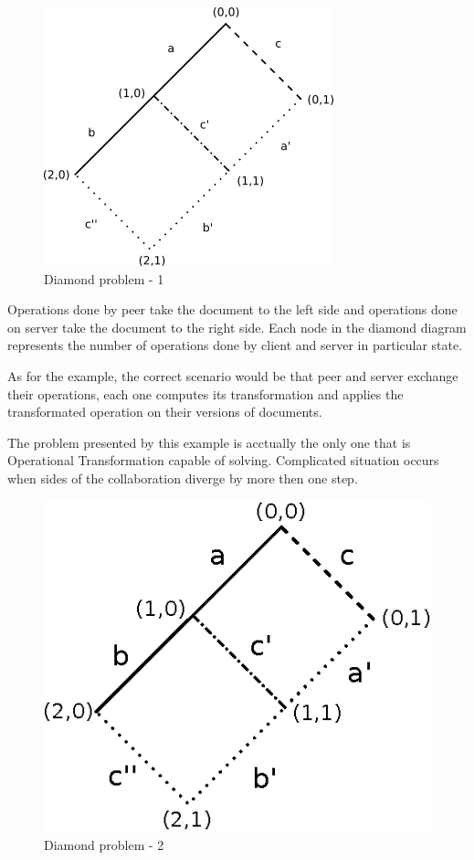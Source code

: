 \documentclass[12pt,oneside]{fithesis2}
\begin{document}
\begin{figure}[H]
\caption{Diamond problem - 1}
\label{fig:diamond1}
\centering
\vspace{5mm}
\includegraphics{diamond1}
\end{figure}
Operations done by peer take the document to the left side and operations done on server take the document to the right side. Each node in the diamond diagram represents the number of operations done by client and server in particular state. 
\par As for the example, the correct scenario would be that peer and server exchange their operations, each one computes its transformation and applies the transformated operation on their versions of documents.
\par The problem presented by this example is acctually the only one that is Operational Transformation capable of solving. Complicated situation occurs when sides of the collaboration diverge by more then one step. 
\begin{figure}[H]
\caption{Diamond problem - 2}
\label{fig:diamond2}
\centering
\vspace{5mm}
\includegraphics{diamond2}
\end{figure}
\end{document}
